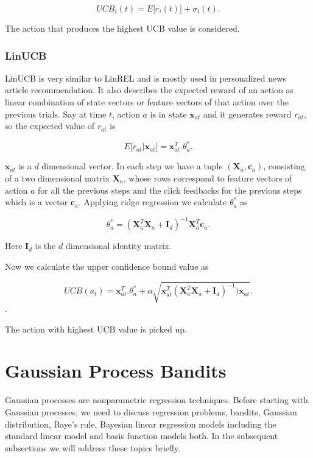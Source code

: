 \documentclass[english]{tktltiki}
\begin{document}
\begin{equation}
UCB_i(t) = E\big[r_i(t)\big] + \sigma_i(t).
\end{equation}

The action that produces the highest UCB value is considered.


\subsubsection{LinUCB}

LinUCB \cite{linucb} is very similar to LinREL and is mostly used in personalized news article recommendation. It also describes the expected reward of an action as linear combination of state vectors or feature vectors of that action over the previous trials. Say at time $t$, action $a$ is in state $\mathbf{x}_{at}$ and it generates reward $r_{at}$, so the expected value of $r_{at}$ is

\begin{equation}
E\big[r_{at}|\mathbf{x}_{at}\big] = \mathbf{x}_{at}^T . \theta_a^*.
\end{equation}

$\mathbf{x}_{at}$ is a $d$ dimensional vector. In each step we have a tuple $(\mathbf{X}_a, \mathbf{c}_a)$, consisting of a two dimensional matrix $\mathbf{X}_a$, whose rows correspond to feature vectors of action $a$ for all the previous steps and the click feedbacks for the previous steps which is a vector $\mathbf{c}_a$. Applying ridge regression we calculate $\theta_a^*$ as

\begin{equation}
\theta_a^* = (\mathbf{X}_a^T \mathbf{X}_a + \mathbf{I}_d)^{-1} \mathbf{X}_a^T \mathbf{c}_a.
\end{equation}

Here $\mathbf{I}_d$ is the $d$ dimensional identity matrix.

Now we calculate the upper confidence bound value as

\begin{equation}
UCB(a_t) = \mathbf{x}_{at}^T . \theta_a^* + \alpha \sqrt{\mathbf{x}_{at}^T (\mathbf{X}_a^T \mathbf{X}_a + \mathbf{I}_d)^{-1}) \mathbf{x}_{at}}.
\end{equation}.

The action with highest UCB value is picked up.

\section{Gaussian Process Bandits}
\label{sec:gpb}
Gaussian processes are nonparametric regression techniques. Before starting with Gaussian processes, we need to discuss regression problems, bandits, Gaussian distribution, Baye's rule, Bayesian linear regression models including the standard linear model and basis function models both. In the subsequent subsections we will address these topics briefly.
\end{document}
